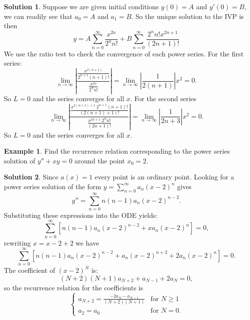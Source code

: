 \documentclass{article}
\theoremstyle{plain}
\theoremstyle{definition}
\newtheorem{exmp}{Example}[section]
\newtheorem*{sol}{Solution}
\numberwithin{equation}{section}
\begin{document}
\begin{tcolorbox}
\begin{sol}
        Suppose we are given initial conditions $y(0)=A$ and $y'(0)=B$, we can readily see that $a_0=A$ and $a_1=B$. So the unique solution to the IVP is then 
        \[
        y = A \sum_{n=0}^{\infty} \frac{x^{2n}}{2^nn!} + B\sum_{n=0}^{\infty}\frac{2^nn!x^{2n+1}}{(2n+1)!}
        \]
        We use the ratio test to check the convergence of each power series. For the first series:
        \[
        \lim_{n\to \infty} \left\vert \frac{\frac{x^{2(n+1)}}{2^{n+1}(n+1)!}}{\frac{x^{2n}}{2^nn!}} \right\vert = \lim_{n\to \infty} \left \vert \frac{1}{2(n+1)} \right \vert x^2 = 0.
        \]
        So $L=0$ and the series converges for all $x$. For the second series
        \[
        \lim_{n\to \infty} \left\vert \frac{\frac{x^{2(n+1)+1} \ 2^{n+1}(n+1)!}{(2(n+1)+1)!}}{\frac{x^{2n+1}\ 2^nn!}{(2n+1)!}} \right\vert = \lim_{n\to \infty} \left \vert \frac{1}{2n+3} \right \vert x^2 = 0.
        \]
        So $L=0$ and the series converges for all $x$.
    \end{sol}
\end{tcolorbox}

\begin{tcolorbox}
    \begin{exmp}
        Find the recurrence relation corresponding to the power series solution of $y''+xy=0$ around the point $x_0=2$.
    \end{exmp}
    \begin{sol}
        Since $a(x)=1$ every point is an ordinary point. Looking for a power series solution of the form $y=\sum_{n=0}^{\infty} a_n(x-2)^n$ gives
        \[
        y''= \sum_{n=0}^{\infty} n(n-1)a_n(x-2)^{n-2}.
        \]
        Substituting these expressions into the ODE yields:
        \[
            \sum_{n=0}^{\infty} \left[ n(n-1)a_n(x-2)^{n-2} + xa_n(x-2)^n\right] = 0,
        \]
        rewriting $x=x-2+2$ we have
        \[
            \sum_{n=0}^{\infty} \left[ n(n-1)a_n(x-2)^{n-2} + a_n(x-2)^{n+2} + 2a_n(x-2)^n\right] = 0.
        \]
        The coefficient of $(x-2)^N$ is:
        \[
        (N+2)(N+1)a_{N+2} + a_{N-1} + 2a_N = 0,
        \]
        so the recurrence relation for the coefficients is
        \[
        \begin{cases}
            a_{N+2} = \frac{-2a_N - a_{N-1}}{(N+2)(N+1)} & \text{for } N \geq 1 \\
            a_2 = a_0 & \text{for } N=0.
        \end{cases}
        \]
    \end{sol}
\end{tcolorbox}
\end{document}
